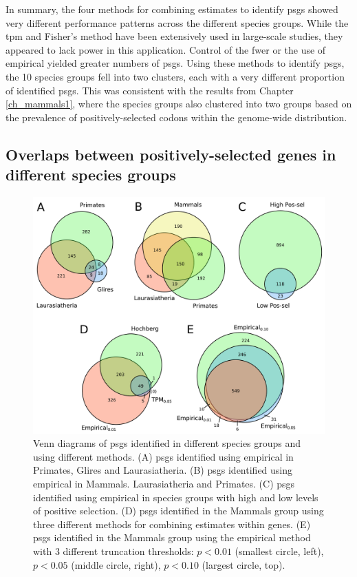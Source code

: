 In summary, the four methods for combining \sw estimates to identify
\acp{psg} showed very different performance patterns across the
different species groups. While the \ac{tpm} and Fisher's method have
been extensively used in large-scale studies, they appeared to lack
power in this application. Control of the \ac{fwer} or the use of
empirical \pvs yielded greater numbers of \acp{psg}. Using these
methods to identify \acp{psg}, the 10 species groups fell into two
clusters, each with a very different proportion of identified
\acp{psg}. This was consistent with the results from Chapter
\ref{ch_mammals1}, where the species groups also clustered into two
groups based on the prevalence of positively-selected codons within
the genome-wide distribution.

\subsection{Overlaps between positively-selected genes in different species groups}

\begin{figure}
\centering
\includegraphics[scale=0.3]{Figs/psg_venns.pdf}
\caption{Venn diagrams of \acp{psg} identified in different species
  groups and using different methods. (A) \acp{psg} identified using
  empirical \pvs in Primates, Glires and Laurasiatheria. (B) \acp{psg}
  identified using empirical \pvs in Mammals. Laurasiatheria and
  Primates. (C) \acp{psg} identified using empirical \pvs in species
  groups with high and low levels of positive selection. (D) \acp{psg}
  identified in the Mammals group using three different methods for
  combining \sw estimates within genes. (E) \acp{psg} identified in
  the Mammals group using the empirical \pv method with 3 different
  truncation thresholds: $p<0.01$ (smallest circle, left), $p<0.05$
  (middle circle, right), $p<0.10$ (largest circle, top).}
\label{fig_psg_venns}
\end{figure}

